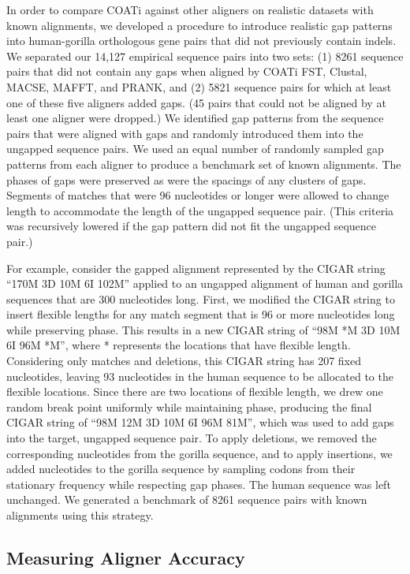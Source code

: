 \documentclass[12pt,letterpaper]{article}
\begin{document}
In order to compare COATi against other aligners on realistic datasets with known alignments, we developed a procedure to introduce realistic gap patterns into human-gorilla orthologous gene pairs that did not previously contain indels. We separated our 14,127 empirical sequence pairs into two sets: %
(1) 8261 sequence pairs that did not contain any gaps when aligned by COATi FST, Clustal\textOmega{}, MACSE, MAFFT, and PRANK, and (2) 5821 sequence pairs for which at least one of these five aligners added gaps.
(45 pairs that could not be aligned by at least one aligner were dropped.) We identified gap patterns from the sequence pairs that were aligned with gaps and randomly introduced them into the ungapped sequence pairs. We used an equal number of randomly sampled gap patterns from each aligner to produce a benchmark set of known alignments. The phases of gaps were preserved as were the spacings of any clusters of gaps. Segments of matches that were 96 nucleotides or longer were allowed to change length to accommodate the length of the ungapped sequence pair. (This criteria was recursively lowered if the gap pattern did not fit the ungapped sequence pair.)

For example, consider the gapped alignment represented by the CIGAR string
%
``170M 3D 10M 6I 102M'' %
%
applied to an ungapped alignment of human and gorilla sequences that are 300 nucleotides long. First, we modified the CIGAR string to insert flexible lengths for any match segment that is 96 or more nucleotides long while preserving phase. This results in a new CIGAR string of
%
``98M *M 3D 10M 6I 96M *M'',
%
where * represents the locations that have flexible length. Considering only matches and deletions, this CIGAR string has 207 fixed nucleotides, leaving 93 nucleotides in the human sequence to be allocated to the flexible locations. Since there are two locations of flexible length, we drew one random break point uniformly while maintaining phase, producing the final CIGAR string of
%
``98M 12M 3D 10M 6I 96M 81M'',
%
which was used to add gaps into the target, ungapped sequence pair.
To apply deletions, we removed the corresponding nucleotides from the gorilla sequence, and to apply insertions, we added nucleotides to the gorilla sequence by sampling codons from their stationary frequency while respecting gap phases. The human sequence was left unchanged.
%
We generated a benchmark of 8261 sequence pairs with known alignments using this strategy.

\subsection*{Measuring Aligner Accuracy}
\end{document}
